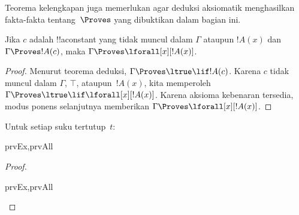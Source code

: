 \documentclass[../../../include/open-logic-section]{subfiles}
\begin{document}


\begin{explain}
  Teorema kelengkapan juga memerlukan agar deduksi aksiomatik menghasilkan
  fakta-fakta tentang~$\Proves$ yang dibuktikan dalam bagian ini.
\end{explain}

\begin{thm}
 Jika $c$ adalah !!a{constant} yang
tidak muncul dalam $\Gamma$ ataupun $!A(x)$ dan $\Gamma \Proves !A(c)$,
maka $\Gamma \Proves \lforall[x][!A(x)]$.
\end{thm}

\begin{proof}
Menurut teorema deduksi, $\Gamma \Proves \ltrue \lif !A(c)$. Karena
$c$ tidak muncul dalam $\Gamma$, $\top$, ataupun~$!A(x)$, kita memperoleh
$\Gamma \Proves \ltrue \lif \lforall[x][!A(x)]$. Karena aksioma
kebenaran tersedia, modus ponens selanjutnya memberikan
$\Gamma \Proves \lforall[x][!A(x)]$.
\end{proof}

\begin{prop}
Untuk setiap suku tertutup~$t$:
\begin{tagenumerate}{prvEx,prvAll}

\end{tagenumerate}
\end{prop}

\begin{proof}
\begin{tagenumerate}{prvEx,prvAll}
\end{tagenumerate}
\end{proof}
\end{document}
